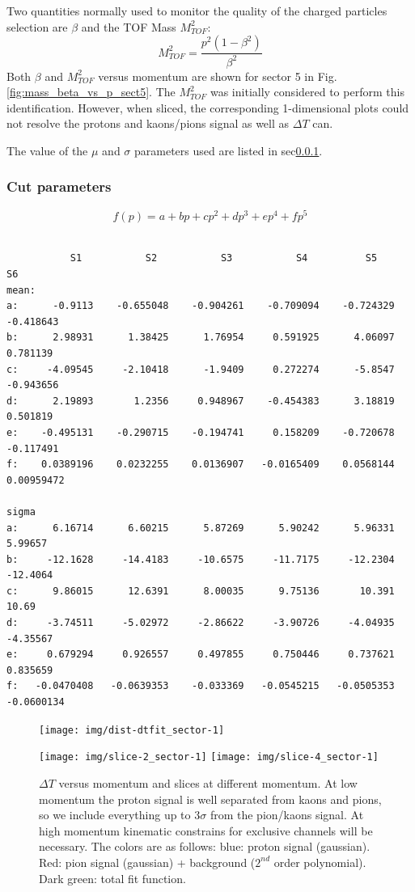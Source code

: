Two quantities normally used to monitor the quality of the charged particles
selection are $\beta$ and the TOF Mass $M_{TOF}^2$:
\[
M_{TOF}^2 = \frac{p^2(1-\beta^2)}{\beta^2}
\]
Both $\beta$ and $M_{TOF}^2$ versus momentum are shown for sector 5 in
Fig.\ref{fig:mass_beta_vs_p_sect5}.
The $M_{TOF}^2$ was initially considered to perform this identification.
However, when sliced, the corresponding 1-dimensional plots could not
resolve the protons and kaons/pions signal as well as $\Delta T$ can.

The value of the $\mu$ and $\sigma$ parameters used are listed in sec\ref{sec:dtp_parameters}.

\subsubsection{Cut parameters}\label{sec:dtp_parameters}
\[
f(p) = a + bp + cp^2 + dp^3 + ep^4 + fp^5
\]
\begin{verbatim}

           S1           S2           S3           S4          S5            S6
mean:
a:      -0.9113    -0.655048    -0.904261    -0.709094    -0.724329    -0.418643
b:      2.98931      1.38425      1.76954     0.591925      4.06097     0.781139
c:     -4.09545     -2.10418      -1.9409     0.272274      -5.8547    -0.943656
d:      2.19893       1.2356     0.948967    -0.454383      3.18819     0.501819
e:    -0.495131    -0.290715    -0.194741     0.158209    -0.720678    -0.117491
f:    0.0389196    0.0232255    0.0136907   -0.0165409    0.0568144   0.00959472

sigma 
a:      6.16714      6.60215      5.87269      5.90242      5.96331      5.99657
b:     -12.1628     -14.4183     -10.6575     -11.7175     -12.2304     -12.4064
c:      9.86015      12.6391      8.00035      9.75136       10.391        10.69
d:     -3.74511     -5.02972     -2.86622     -3.90726     -4.04935     -4.35567
e:     0.679294     0.926557     0.497855     0.750446     0.737621     0.835659
f:   -0.0470408   -0.0639353    -0.033369   -0.0545215   -0.0505353   -0.0600134

\end{verbatim}

\clearpage\newpage

\begin{figure}[ht]
    \centering
    \texttt{[image: img/dist-dtfit\_sector-1]}

    \texttt{[image: img/slice-2\_sector-1]}
    \texttt{[image: img/slice-4\_sector-1]}

    \caption{$\Delta T$ versus momentum and slices at different momentum.
    At low momentum the proton signal is well separated
    from kaons and pions, so we include everything up to
        $3\sigma$ from the pion/kaons signal. At high momentum
        kinematic constrains for exclusive channels will be necessary.
        The colors are as follows: blue: proton signal (gaussian).
        Red: pion signal (gaussian) + background ($2^{nd}$ order
        polynomial). Dark green: total fit function.}
    \label{fig:dt_vs_mom}
\end{figure}

